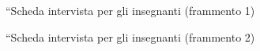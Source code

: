 \documentclass[12pt]{report}
\begin{document}
\bigskip

\begin{figure}[H]
	\centering
	\caption{``Scheda intervista per gli insegnanti (frammento 1)}\label{robot}
\end{figure}

\begin{figure}[H]
	\centering
	\caption{``Scheda intervista per gli insegnanti (frammento 2)}\label{robot}
\end{figure}
\end{document}
